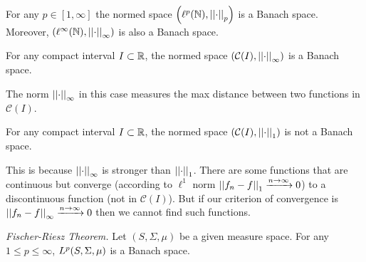 \documentclass{article}
\begin{document}
\begin{proposition}
	For any $p\in[1,\infty]$ the normed space $\left(\ell^{p}(\mathbb{N}),\left|\left|\cdot\right|\right|_{p}\right)$ is a Banach space. Moreover, $\left(\ell^{\infty}(\mathbb{N}),\left|\left|\cdot\right|\right|_{\infty}\right)$ is also a Banach space.
\end{proposition}
\begin{proposition}
	For any compact interval $I\subset\mathbb{R}$, the normed space $\left(\mathcal{C}(I),\left|\left|\cdot\right|\right|_{\infty}\right)$ is a Banach space.
\end{proposition}
The norm $\left|\left|\cdot\right|\right|_{\infty}$ in this case measures the max distance between two functions in $\mathcal{C}(I)$.
\begin{proposition}
	For any compact interval $I\subset\mathbb{R}$, the normed space $\left(\mathcal{C}(I),\left|\left|\cdot\right|\right|_{1}\right)$ is not a Banach space.
\end{proposition}
This is because $\left|\left|\cdot\right|\right|_{\infty}$ is stronger than $\left|\left|\cdot\right|\right|_{1}$. There are some functions that are continuous but converge (according to $\ell^{1}$ norm $\left|\left|f_{n}-f\right|\right|_{1}\xrightarrow{n\to\infty}0$) to a discontinuous function (not in $\mathcal{C}(I)$). But if our criterion of convergence is $\left|\left|f_{n}-f\right|\right|_{\infty}\xrightarrow{n\to\infty}0$ then we cannot find such functions.
\begin{theorem}
	\emph{Fischer-Riesz Theorem.} Let $(S,\Sigma,\mu)$ be a given measure space. For any $1\leq p\leq\infty$, $L^{p}(S,\Sigma,\mu)$ is a Banach space.
\end{theorem}
\end{document}
